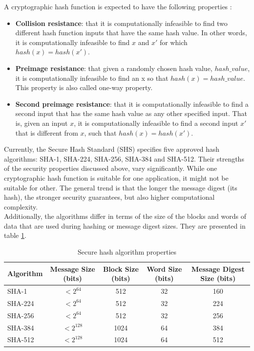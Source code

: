 A cryptographic hash function is expected to have the following properties
\cite{nist-hash}:\\

\begin{itemize}
	\item \textbf{Collision resistance}: that it is computationally infeasible
	to find two different hash function inputs that have the same hash value.
	In other words, it is computationally infeasible to find $x$ and $x'$ for
	which $hash(x) = hash(x')$.
	\item \textbf{Preimage resistance}: that given a randomly chosen hash
	value, $hash\_value$, it is computationally infeasible to find an x so that
	$hash(x) = hash\_value$. This property is also called one-way property.
	\item \textbf{Second preimage resistance}: that it is computationally
	infeasible to find a second input that has the same hash value as any other
	specified input. That is, given an input $x$, it is computationally
	infeasible to find a second input $x'$ that is different from $x$, such
	that $hash(x) = hash(x')$.
\end{itemize}

Currently, the Secure Hash Standard (SHS) \cite{fips-shs} specifies five
approved hash algorithms: SHA-1, SHA-224, SHA-256, SHA-384 and SHA-512. Their
strengths of the security properties discussed above, vary significantly. While
one cryptographic hash function is suitable for one application, it might not
be suitable for other. The general trend is that the longer the message digest
(its hash), the stronger security guarantees, but also higher computational
complexity.\\

Additionally, the algorithms differ in terms of the size of the blocks and
words of data that are used during hashing or message digest sizes. They are
presented in table \ref{tab:hash-comparison}.

\begin{table}[h!]
\centering
\begin{tabular}{|l||c|c|c|c|}
	\hline
	Algorithm & Message Size (bits) & Block Size (bits) & Word Size (bits) & Message Digest Size (bits) \\ \hline \hline
	SHA-1   &  $< 2^{64}$ &  512 & 32 & 160 \\ \hline
	SHA-224 &  $< 2^{64}$ &  512 & 32 & 224 \\ \hline
	SHA-256 &  $< 2^{64}$ &  512 & 32 & 256 \\ \hline
	SHA-384 & $< 2^{128}$ & 1024 & 64 & 384 \\ \hline
	SHA-512 & $< 2^{128}$ & 1024 & 64 & 512 \\ \hline
\end{tabular}
\caption{Secure hash algorithm properties \cite{fips-shs}}
\label{tab:hash-comparison}
\end{table}

